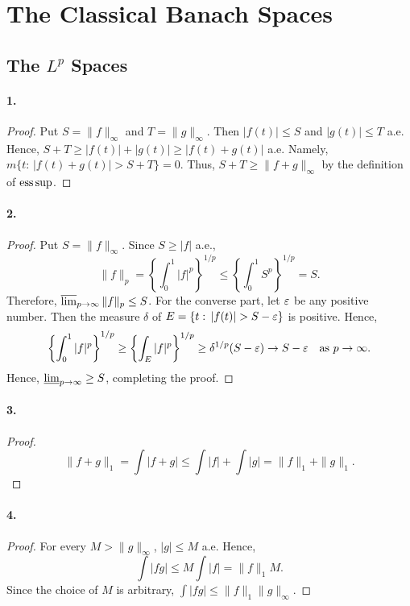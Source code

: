 \section{The Classical Banach Spaces}
\subsection{The $L^p$ Spaces}
  \paragraph{1.}
  \begin{proof}
    Put $S=\|f\|_\infty$ and $T=\|g\|_\infty$. Then $|f(t)|\le S$ and $|g(t)|\le
    T$ a.e. Hence, $S+T\ge |f(t)|+|g(t)| \ge |f(t)+g(t)|$ a.e. Namely, $m\{t:
    \,|f(t)+g(t)|>S+T\}=0$. Thus, $S+T\ge \|f+g\|_\infty$ by the definition of 
    $\operatorname*{ess\,sup}$.
  \end{proof}

  \paragraph{2.}
  \begin{proof}
    Put $S=\|f\|_\infty$. Since $S\ge |f|$ a.e., 
    \[
      \|f\|_p=
      \left\{\int_0^1|f|^p\right\}^{1/p} \le 
      \left\{\int_0^1S^p\right\}^{1/p} = S.
    \]
    Therefore, $\operatorname*{\overline{lim}}_{p\to\infty}\|f\|_p \le S$. For the converse part, let 
    $\varepsilon$ be any positive number. Then the measure $\delta$ of $E=\{t:\,|f(t)|>
    S-\vep\}$ is positive. Hence,
    \[
      \left\{\int_0^1|f|^p\right\}^{1/p} \ge
      \left\{\int_E|f|^p\right\}^{1/p} \ge 
      \delta^{1/p}(S-\varepsilon) \to 
      S-\varepsilon\quad\text{as $p\to\infty$.}
    \]
    Hence, $\operatorname*{\underline{lim}}_{p\to\infty}\ge S$, completing the proof.
  \end{proof}

  \paragraph{3.}
  \begin{proof}
    \[
      \|f+g\|_1 = \int|f+g| \le \int|f|+\int|g| = \|f\|_1+\|g\|_1.
    \]
  \end{proof}

  \paragraph{4.}
  \begin{proof}
    For every $M>\|g\|_\infty$, $|g|\le M$ a.e. Hence,
    \[
      \int|fg|\le M\int|f| = \|f\|_1 M.
    \]
    Since the choice of $M$ is arbitrary, $\int|fg|\le \|f\|_1\|g\|_\infty$.
  \end{proof}

